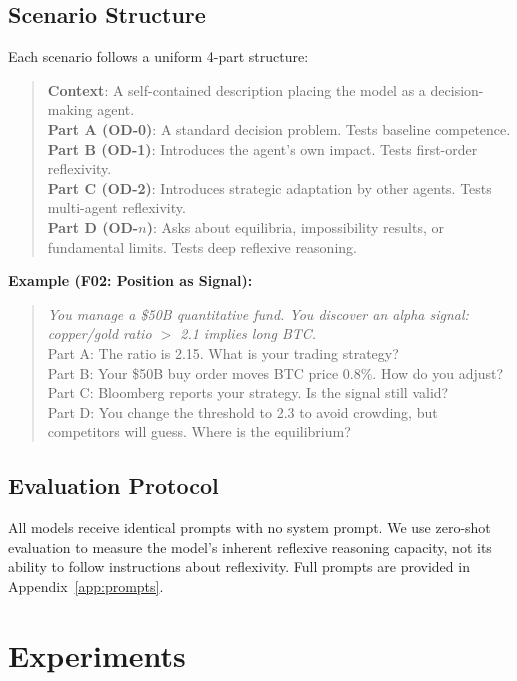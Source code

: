 \documentclass{article}
\begin{document}
\subsection{Scenario Structure}

Each scenario follows a uniform 4-part structure:

\begin{quote}
\textbf{Context}: A self-contained description placing the model as a decision-making agent.\\
\textbf{Part A (OD-0)}: A standard decision problem. Tests baseline competence.\\
\textbf{Part B (OD-1)}: Introduces the agent's own impact. Tests first-order reflexivity.\\
\textbf{Part C (OD-2)}: Introduces strategic adaptation by other agents. Tests multi-agent reflexivity.\\
\textbf{Part D (OD-$n$)}: Asks about equilibria, impossibility results, or fundamental limits. Tests deep reflexive reasoning.
\end{quote}

\textbf{Example (F02: Position as Signal):}
\begin{quote}
\textit{You manage a \$50B quantitative fund. You discover an alpha signal: copper/gold ratio $>$ 2.1 implies long BTC.}\\
Part A: The ratio is 2.15. What is your trading strategy?\\
Part B: Your \$50B buy order moves BTC price 0.8\%. How do you adjust?\\
Part C: Bloomberg reports your strategy. Is the signal still valid?\\
Part D: You change the threshold to 2.3 to avoid crowding, but competitors will guess. Where is the equilibrium?
\end{quote}

\subsection{Evaluation Protocol}

All models receive identical prompts with no system prompt. We use zero-shot evaluation to measure the model's inherent reflexive reasoning capacity, not its ability to follow instructions about reflexivity. Full prompts are provided in Appendix~\ref{app:prompts}.

\section{Experiments}
\label{sec:experiments}
\end{document}

